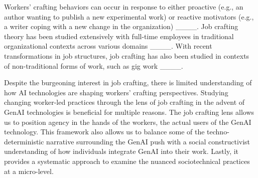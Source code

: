 Workers' crafting behaviors can occur in response to either proactive (e.g., an author wanting to publish a new experimental work) or reactive motivators (e.g., a writer coping with a new change in the organization) ____. 
Job crafting theory has been studied extensively with full-time employees in traditional organizational contexts across various domains ____. 
With recent transformations in job structures, job crafting has also been studied in contexts of non-traditional forms of work, such as gig work ____. 

Despite the burgeoning interest in job crafting, there is limited understanding of how AI technologies are shaping workers' crafting perspectives. Studying changing worker-led practices through the lens of job crafting in the advent of GenAI technologies is beneficial for multiple reasons. The job crafting lens allows us to position agency in the hands of the workers, the actual users of the GenAI technology. This framework also allows us to balance some of the techno-deterministic narrative surrounding the GenAI push with a social constructivist understanding of how individuals integrate GenAI into their work. Lastly, it provides a systematic approach to examine the nuanced sociotechnical practices at a micro-level.